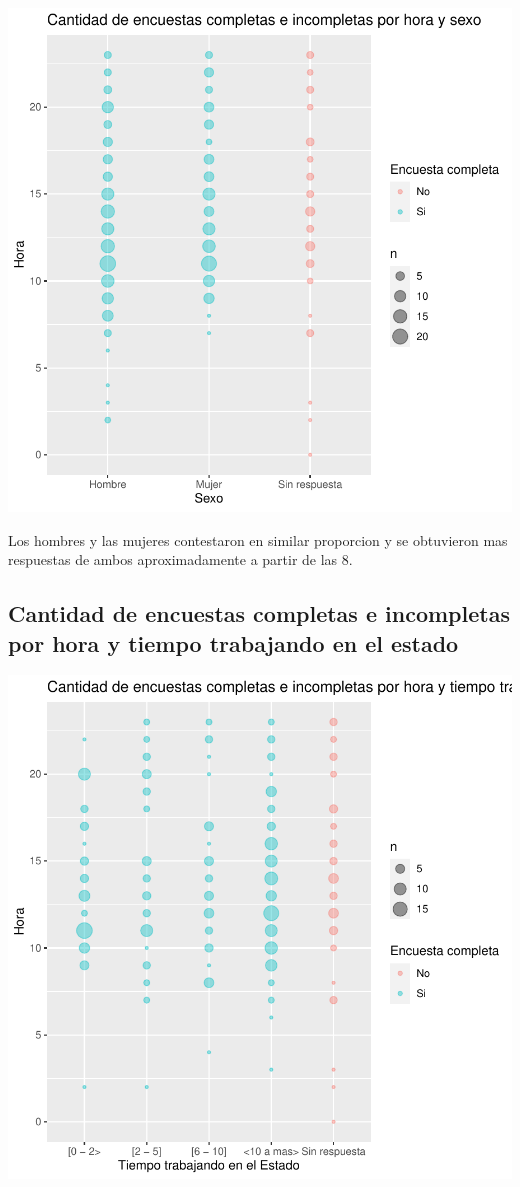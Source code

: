 \documentclass{article}
\begin{document}
\includegraphics{seguimientov3-074}

Los hombres y las mujeres contestaron en similar proporcion y se obtuvieron mas respuestas de ambos aproximadamente a partir de las 8.

\subsection{Cantidad de encuestas completas e incompletas por hora y tiempo trabajando en el estado}

\includegraphics{seguimientov3-075}
\end{document}

